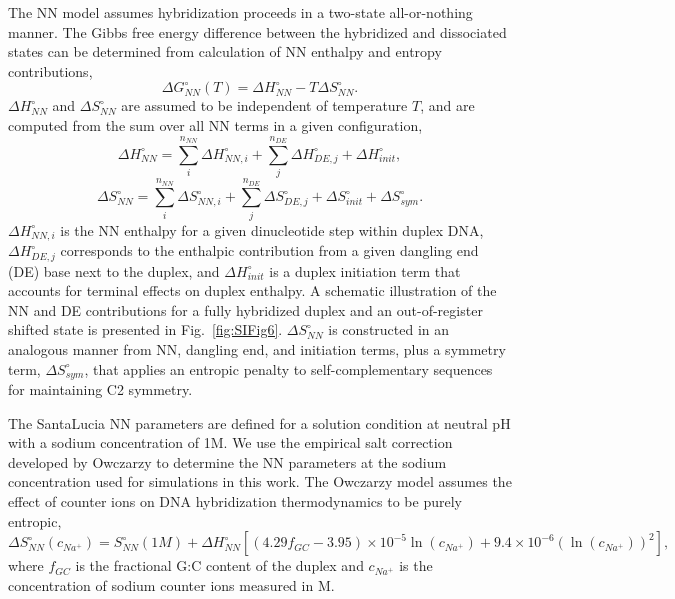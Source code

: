 \documentclass[journal=jpcbfk,manuscript=article]{achemso}
\begin{document}
The NN model assumes hybridization proceeds in a two-state all-or-nothing manner. The Gibbs free energy difference between the hybridized and dissociated states can be determined from calculation of NN enthalpy and entropy contributions,
\begin{equation}\label{SIe1}
\Delta G_{NN}^{\circ}(T) = \Delta H_{NN}^{\circ} - T\Delta S_{NN}^{\circ}.
\end{equation}
$\Delta H_{NN}^{\circ}$ and $\Delta S_{NN}^{\circ}$ are assumed to be independent of temperature $T$, and are computed from the sum over all NN terms in a given configuration,
\begin{equation}\label{SIe2}
\Delta H_{NN}^{\circ} = \sum_{i}^{n_{NN}}\Delta H_{NN, i}^{\circ} + \sum_{j}^{n_{DE}}\Delta H_{DE, j}^{\circ} + \Delta H_{init}^{\circ},
\end{equation}
\begin{equation}\label{SIe3}
\Delta S_{NN}^{\circ} = \sum_{i}^{n_{NN}}\Delta S_{NN, i}^{\circ} + \sum_{j}^{n_{DE}}\Delta S_{DE, j}^{\circ} + \Delta S_{init}^{\circ} + \Delta S_{sym}^{\circ}.
\end{equation}                          
$\Delta H_{NN, i}^{\circ}$ is the NN enthalpy for a given dinucleotide step within duplex DNA, $\Delta H_{DE, j}^{\circ}$ corresponds to the enthalpic contribution from a given dangling end (DE) base next to the duplex\citep{Santalucia2004TheMotifs}, and $\Delta H_{init}^{\circ}$ is a duplex initiation term that accounts for terminal effects on duplex enthalpy. A schematic illustration of the NN and DE contributions for a fully hybridized duplex and an out-of-register shifted state is presented in Fig.~\ref{fig:SIFig6}. $\Delta S_{NN}^{\circ}$ is constructed in an analogous manner from NN, dangling end, and initiation terms, plus a symmetry term, $\Delta S_{sym}^{\circ}$, that applies an entropic penalty to self-complementary sequences for maintaining C2 symmetry. 

The SantaLucia NN parameters are defined for a solution condition at neutral pH with a sodium concentration of 1M. We use the empirical salt correction developed by Owczarzy\citep{Owczarzy2008PredictingCations} to determine the NN parameters at the sodium concentration used for simulations in this work. The Owczarzy model assumes the effect of counter ions on DNA hybridization thermodynamics to be purely entropic,
\begin{equation}\label{SIe4}
\Delta S_{NN}^{\circ}(c_{Na^+}) = S_{NN}^{\circ}(1M) + \Delta H_{NN}^{\circ}[(4.29f_{GC}-3.95)\times 10^{-5} \ln{(c_{Na^+})}+ 9.4\times 10^{-6} (\ln{(c_{Na^+})})^2],
\end{equation} 
where $f_{GC}$ is the fractional G:C content of the duplex and $c_{Na^+}$ is the concentration of sodium counter ions measured in M.  
\end{document}
